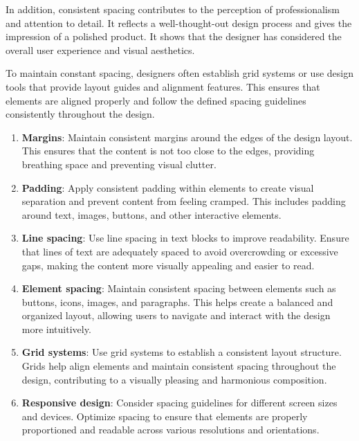 In addition, consistent spacing contributes to the perception of professionalism and attention to detail. It reflects a well-thought-out design process and gives the impression of a polished product. It shows that the designer has considered the overall user experience and visual aesthetics.

To maintain constant spacing, designers often establish grid systems or use design tools that provide layout guides and alignment features. This ensures that elements are aligned properly and follow the defined spacing guidelines consistently throughout the design.





\begin{enumerate}
  \item \textbf{Margins}: Maintain consistent margins around the edges of the design layout. This ensures that the content is not too close to the edges, providing breathing space and preventing visual clutter.
  
  \item \textbf{Padding}: Apply consistent padding within elements to create visual separation and prevent content from feeling cramped. This includes padding around text, images, buttons, and other interactive elements.
  
  \item \textbf{Line spacing}: Use line spacing in text blocks to improve readability. Ensure that lines of text are adequately spaced to avoid overcrowding or excessive gaps, making the content more visually appealing and easier to read.
  
  \item \textbf{Element spacing}: Maintain consistent spacing between elements such as buttons, icons, images, and paragraphs. This helps create a balanced and organized layout, allowing users to navigate and interact with the design more intuitively.
  
  \item \textbf{Grid systems}: Use grid systems to establish a consistent layout structure. Grids help align elements and maintain consistent spacing throughout the design, contributing to a visually pleasing and harmonious composition.
  
  \item \textbf{Responsive design}: Consider spacing guidelines for different screen sizes and devices. Optimize spacing to ensure that elements are properly proportioned and readable across various resolutions and orientations.
\end{enumerate}



